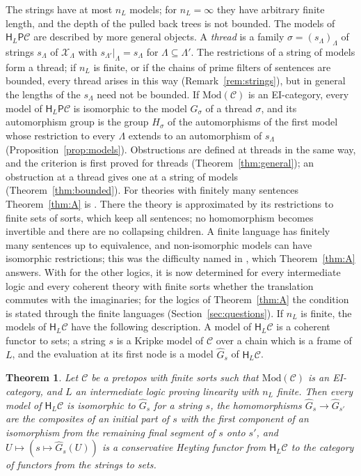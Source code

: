 \documentclass[11pt]{amsart}
\newtheorem{thm}{Theorem}[section]
\theoremstyle{definition}
\newcommand{\Mod}{\mathrm{Mod}}
\newcommand{\PP}{\mathsf P}
\newcommand{\HH}{\mathsf H}
\newcommand{\cX}{\mathcal X}
\newcommand{\cC}{\mathcal C}
\begin{document}
The strings have at most $n_L$ models; for $n_L=\infty$ they have
arbitrary finite length, and the depth of the pulled back trees is not
bounded. The models of $\HH_L\PP\cC$ are described by more general
objects. A \emph{thread} is a family $\sigma=(s_\Lambda)_\Lambda$ of
strings $s_\Lambda$ of $\cX_\Lambda$ with
$s_{\Lambda'}|_\Lambda=s_\Lambda$ for $\Lambda\subseteq\Lambda'$. The
restrictions of a string of models form a thread; if $n_L$ is finite,
or if the chains of prime filters of sentences are bounded, every
thread arises in this way (Remark~\ref{rem:strings}), but in general
the lengths of the $s_\Lambda$ need not be bounded. If
$\Mod(\cC)$ is an EI-category, every model of $\HH_L\PP\cC$ is
isomorphic to the model $\hat G_\sigma$ of a thread $\sigma$, and its
automorphism group is the group $H_\sigma$ of the automorphisms of the
first model whose restriction to every $\Lambda$ extends to an
automorphism of $s_\Lambda$ (Proposition~\ref{prop:models}).
Obstructions are defined at threads in the same way, and the criterion
is first proved for threads (Theorem~\ref{thm:general}); an
obstruction at a thread gives one at a string of models
(Theorem~\ref{thm:bounded}). For theories with
finitely many sentences Theorem~\ref{thm:A} is
\cite[Thm.~1.1]{Proftrees}. There the theory is approximated by its
restrictions to finite sets of sorts, which keep all sentences; no
homomorphism becomes invertible and there are no collapsing children.
A finite language has finitely many sentences up to equivalence, and
non-isomorphic models can have isomorphic restrictions; this was the
difficulty named in \cite[Question~10.1]{Proftrees}, which
Theorem~\ref{thm:A} answers. With \cite{Finsorts} for the other
logics, it is now determined for every intermediate logic and every
coherent theory with finite sorts whether the translation commutes
with the imaginaries; for the logics of Theorem~\ref{thm:A} the
condition is stated through the finite languages
(Section~\ref{sec:questions}). If $n_L$ is finite, the models of
$\HH_L\cC$ have the following description. A model of $\HH_L\cC$ is a
coherent functor to sets; a string $s$ is a Kripke model of $\cC$ over
a chain which is a frame of $L$, and the evaluation at its first node
is a model $\hat G_s$ of $\HH_L\cC$.

\begin{thm}\label{thm:B}
Let $\cC$ be a pretopos with finite sorts such that $\Mod(\cC)$ is an
EI-category, and $L$ an intermediate logic proving linearity with
$n_L$ finite. Then every model of $\HH_L\cC$ is isomorphic to $\hat
G_s$ for a string $s$, the homomorphisms $\hat G_s\to\hat G_{s'}$ are
the composites of an initial part of $s$ with the first component of
an isomorphism from the remaining final segment of $s$ onto $s'$, and
$U\mapsto(s\mapsto\hat G_s(U))$ is a conservative Heyting functor from
$\HH_L\cC$ to the category of functors from the strings to sets.
\end{thm}
\end{document}
